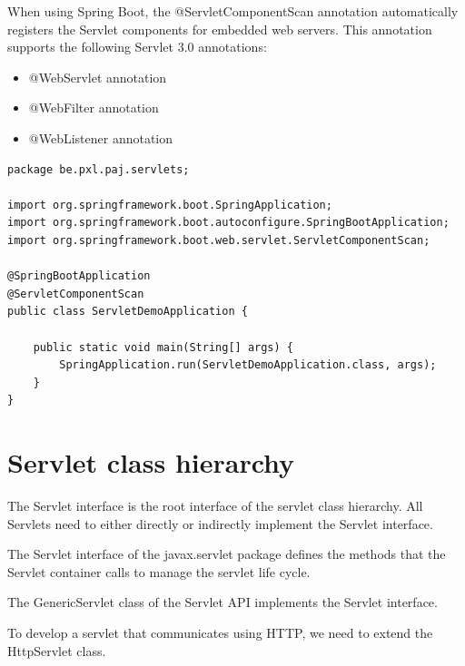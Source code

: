 When using Spring Boot, the @ServletComponentScan annotation automatically registers the Servlet components for embedded web servers. This annotation supports the following Servlet 3.0 annotations:
\begin{itemize}
\item @WebServlet annotation
\item @WebFilter annotation
\item @WebListener annotation
\end{itemize}

\begin{lstlisting}
package be.pxl.paj.servlets;

import org.springframework.boot.SpringApplication;
import org.springframework.boot.autoconfigure.SpringBootApplication;
import org.springframework.boot.web.servlet.ServletComponentScan;

@SpringBootApplication
@ServletComponentScan
public class ServletDemoApplication {

	public static void main(String[] args) {
		SpringApplication.run(ServletDemoApplication.class, args);
	}
}
\end{lstlisting}

\section{Servlet class hierarchy}

The Servlet interface is the root interface of the servlet class hierarchy. All Servlets need to either directly or indirectly implement the Servlet interface. 

The Servlet interface of the javax.servlet package defines the methods that the Servlet container calls to manage the servlet life cycle. 

The GenericServlet class of the Servlet API implements the Servlet interface.

To develop a servlet that communicates using HTTP, we need to extend the HttpServlet class.

